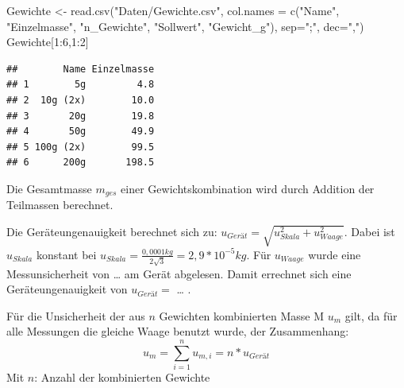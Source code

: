 \documentclass[
]{article}
\newenvironment{Shaded}{\begin{snugshade}}{\end{snugshade}}
\newcommand{\AttributeTok}[1]{\textcolor[rgb]{0.77,0.63,0.00}{#1}}
\newcommand{\DecValTok}[1]{\textcolor[rgb]{0.00,0.00,0.81}{#1}}
\newcommand{\FunctionTok}[1]{\textcolor[rgb]{0.00,0.00,0.00}{#1}}
\newcommand{\NormalTok}[1]{#1}
\newcommand{\OtherTok}[1]{\textcolor[rgb]{0.56,0.35,0.01}{#1}}
\newcommand{\SpecialCharTok}[1]{\textcolor[rgb]{0.00,0.00,0.00}{#1}}
\newcommand{\StringTok}[1]{\textcolor[rgb]{0.31,0.60,0.02}{#1}}
\begin{document}
\begin{Shaded}
\begin{Highlighting}[]
\NormalTok{Gewichte }\OtherTok{\textless{}{-}} \FunctionTok{read.csv}\NormalTok{(}\StringTok{"Daten/Gewichte.csv"}\NormalTok{, }
                     \AttributeTok{col.names =} \FunctionTok{c}\NormalTok{(}\StringTok{"Name"}\NormalTok{, }\StringTok{"Einzelmasse"}\NormalTok{, }
                                   \StringTok{"n\_Gewichte"}\NormalTok{, }\StringTok{"Sollwert"}\NormalTok{, }\StringTok{"Gewicht\_g"}\NormalTok{),}
                     \AttributeTok{sep=}\StringTok{";"}\NormalTok{, }\AttributeTok{dec=}\StringTok{","}\NormalTok{)}
\NormalTok{Gewichte[}\DecValTok{1}\SpecialCharTok{:}\DecValTok{6}\NormalTok{,}\DecValTok{1}\SpecialCharTok{:}\DecValTok{2}\NormalTok{]}
\end{Highlighting}
\end{Shaded}

\begin{verbatim}
##        Name Einzelmasse
## 1        5g         4.8
## 2  10g (2x)        10.0
## 3       20g        19.8
## 4       50g        49.9
## 5 100g (2x)        99.5
## 6      200g       198.5
\end{verbatim}

Die Gesamtmasse \(m_{ges}\) einer Gewichtskombination wird durch
Addition der Teilmassen berechnet.

Die Geräteungenauigkeit berechnet sich zu:
\(u_{Gerät}= \sqrt{u_{Skala}^2+u_{Waage}^2}\). Dabei ist \(u_{Skala}\)
konstant bei \(u_{Skala} = \frac{0,0001kg}{2\sqrt{3}}=2,9*10^{-5}kg\).
Für \(u_{Waage}\) wurde eine Messunsicherheit von \ldots{} am Gerät
abgelesen. Damit errechnet sich eine Geräteungenauigkeit von
\(u_{Gerät}=\) \ldots{} .

Für die Unsicherheit der aus \(n\) Gewichten kombinierten Masse M
\(u_{m}\) gilt, da für alle Messungen die gleiche Waage benutzt wurde,
der Zusammenhang: \[u_m = \sum\limits_{i=1}^{n}u_{m,i} = n*u_{Gerät}\]
Mit \(n\): Anzahl der kombinierten Gewichte
\end{document}
